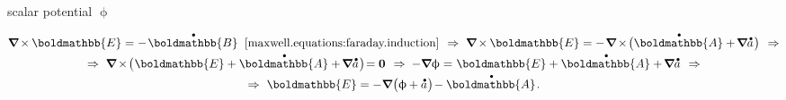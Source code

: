 scalar potential $\upphi$

\nopagebreak\begin{multline}
\boldnabla \hspace{-0.15ex} \times \hspace{-0.1ex} \boldmathbb{E} = - \hspace{.2ex} \mathdotabove{\boldmathbb{B}}
\;\;\eqref{maxwell.equations:faraday.induction}
\hspace{.4em} \Rightarrow \hspace{.3em}
\boldnabla \hspace{-0.15ex} \times \hspace{-0.1ex} \boldmathbb{E} = - \hspace{.2ex} \boldnabla \hspace{-0.15ex} \times \hspace{-0.3ex} \bigl( \mathdotabove{\boldmathbb{A}} + \hspace{-0.2ex} \boldnabla \mathdotabove{a} \hspace{.15ex} \bigr)
\hspace{.4em} \Rightarrow
\\[-0.1em]
\Rightarrow \hspace{.3em}
\boldnabla \hspace{-0.15ex} \times \hspace{-0.3ex} \bigl( \hspace{.1ex} \boldmathbb{E} + \mathdotabove{\boldmathbb{A}} + \hspace{-0.2ex} \boldnabla \mathdotabove{a} \hspace{.15ex} \bigr) \hspace{-0.4ex} = \zerovector
\hspace{.4em} \Rightarrow \hspace{.25em}
- \boldnabla \upphi = \hspace{.1ex} \boldmathbb{E} + \mathdotabove{\boldmathbb{A}} + \hspace{-0.2ex} \boldnabla \mathdotabove{a}
\hspace{.4em} \Rightarrow
\\[-0.1em]
\Rightarrow \hspace{.33em}
\boldmathbb{E} = - \boldnabla \hspace{.1ex} \bigl( \upphi \hspace{-0.1ex} + \mathdotabove{a} \hspace{.1ex} \bigr) \hspace{-0.3ex} - \mathdotabove{\boldmathbb{A}}
\hspace{.2ex} .
\end{multline}

